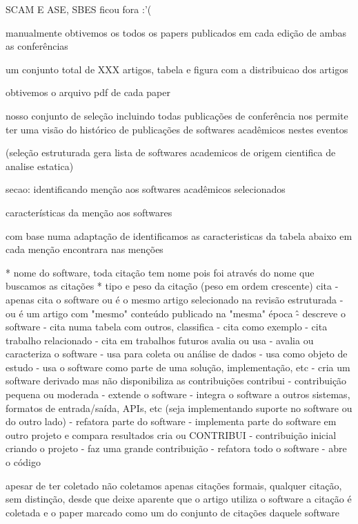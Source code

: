 SCAM E ASE, SBES ficou fora :'(

manualmente obtivemos os todos os papers publicados em cada edição
de ambas as conferências

um conjunto total de  XXX artigos, tabela e figura com a distribuicao
dos artigos

obtivemos o arquivo pdf de cada paper

nosso conjunto de seleção incluindo todas publicações de conferência
nos permite ter uma visão do histórico de publicações de softwares
acadêmicos nestes eventos

(seleção estruturada gera lista de softwares academicos de origem cientifica de analise estatica)

secao: identificando menção aos softwares acadêmicos selecionados

características da menção aos softwares

com base numa adaptação de \cite{howison2016software} identificamos as caracteristicas
da tabela abaixo em cada menção encontrara nas menções

* nome do software, toda citação tem nome pois foi através do nome que buscamos as citações
* tipo e peso da citação (peso em ordem crescente)
cita
  - apenas cita o software ou é o mesmo artigo selecionado na revisão estruturada
  - ou é um artigo com "mesmo" conteúdo publicado na "mesma" época \^
  - descreve o software
  - cita numa tabela com outros, classifica
  - cita como exemplo
  - cita trabalho relacionado
  - cita em trabalhos futuros
avalia ou usa
  - avalia ou caracteriza o software
  - usa para coleta ou análise de dados
  - usa como objeto de estudo
  - usa o software como parte de uma solução, implementação, etc
  - cria um software derivado mas não disponibiliza as contribuições
contribui
  - contribuição pequena ou moderada
  - extende o software
  - integra o software a outros sistemas, formatos de entrada/saída, APIs, etc
    (seja implementando suporte no software ou do outro lado)
  - refatora parte do software
  - implementa parte do software em outro projeto e compara resultados
cria ou CONTRIBUI
  - contribuição inicial criando o projeto
  - faz uma grande contribuição
  - refatora todo o software
  - abre o código

apesar de ter coletado não coletamos apenas citações formais, qualquer citação,
sem distinção, desde que deixe aparente que o artigo utiliza o software a citação
é coletada e o paper marcado como um do conjunto de citações daquele software

